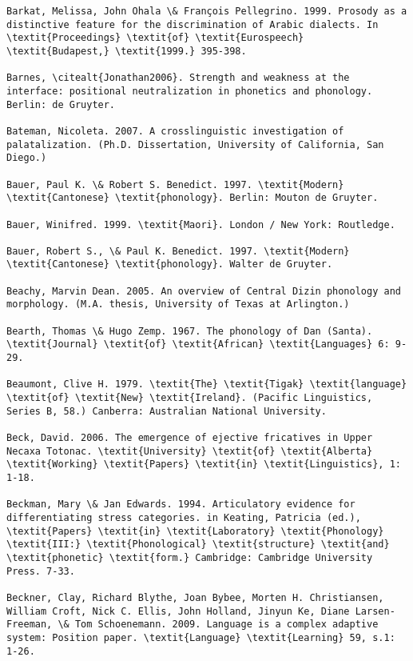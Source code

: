 \begin{verbatim}
Barkat, Melissa, John Ohala \& François Pellegrino. 1999. Prosody as a distinctive feature for the discrimination of Arabic dialects. In \textit{Proceedings} \textit{of} \textit{Eurospeech} \textit{Budapest,} \textit{1999.} 395-398.

Barnes, \citealt{Jonathan2006}. Strength and weakness at the interface: positional neutralization in phonetics and phonology. Berlin: de Gruyter.

Bateman, Nicoleta. 2007. A crosslinguistic investigation of palatalization. (Ph.D. Dissertation, University of California, San Diego.)

Bauer, Paul K. \& Robert S. Benedict. 1997. \textit{Modern} \textit{Cantonese} \textit{phonology}. Berlin: Mouton de Gruyter.

Bauer, Winifred. 1999. \textit{Maori}. London / New York: Routledge.

Bauer, Robert S., \& Paul K. Benedict. 1997. \textit{Modern} \textit{Cantonese} \textit{phonology}. Walter de Gruyter.

Beachy, Marvin Dean. 2005. An overview of Central Dizin phonology and morphology. (M.A. thesis, University of Texas at Arlington.)

Bearth, Thomas \& Hugo Zemp. 1967. The phonology of Dan (Santa). \textit{Journal} \textit{of} \textit{African} \textit{Languages} 6: 9-29.

Beaumont, Clive H. 1979. \textit{The} \textit{Tigak} \textit{language} \textit{of} \textit{New} \textit{Ireland}. (Pacific Linguistics, Series B, 58.) Canberra: Australian National University.

Beck, David. 2006. The emergence of ejective fricatives in Upper Necaxa Totonac. \textit{University} \textit{of} \textit{Alberta} \textit{Working} \textit{Papers} \textit{in} \textit{Linguistics}, 1: 1-18.

Beckman, Mary \& Jan Edwards. 1994. Articulatory evidence for differentiating stress categories. in Keating, Patricia (ed.), \textit{Papers} \textit{in} \textit{Laboratory} \textit{Phonology} \textit{III:} \textit{Phonological} \textit{structure} \textit{and} \textit{phonetic} \textit{form.} Cambridge: Cambridge University Press. 7-33.

Beckner, Clay, Richard Blythe, Joan Bybee, Morten H. Christiansen, William Croft, Nick C. Ellis, John Holland, Jinyun Ke, Diane Larsen-Freeman, \& Tom Schoenemann. 2009. Language is a complex adaptive system: Position paper. \textit{Language} \textit{Learning} 59, s.1: 1-26.


\end{verbatim}
